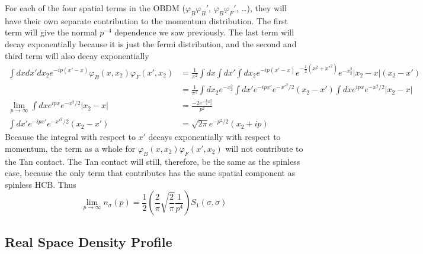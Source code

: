 \documentclass[onecolumn,english,aps,pra]{revtex4}
\begin{document}
%
For each of the four spatial terms in the OBDM ($\varphi_B\varphi_B'$, $\varphi_B\varphi_F'$, \ldots), they will have their own separate contribution to the momentum distribution. The first term will give the normal $p^{-4}$ dependence we saw previously. The last term will decay exponentially because it is just the fermi distribution, and the second and third term will also decay exponentially
\begin{align*}
\int dx dx' dx_2 e^{-ip(x'-x)}\varphi_B(x, x_2)\varphi_F(x', x_2)
& =\frac{1}{\pi^2}\int dx \int dx' \int dx_2 e^{-ip(x'-x)} e^{-\frac{1}{2}(x^2 + x'^2) } e^{-x_2^2}|x_2 - x| (x_2 - x')\\
& =\frac{1}{\pi^2}\int dx_2 e^{-x_2^2} \int dx' e^{-ipx'} e^{-x'^2/2} (x_2 - x') \int dx e^{ipx}e^{-x^2/2}|x_2 - x|\\
\lim_{p \rightarrow \infty} \int dx e^{ipx}e^{-x^2/2}|x_2 - x| &= \frac{-2 e^{-\frac{1}{2} x_2^2}}{p^2}\\
\int dx' e^{-ipx'} e^{-x'^2/2} (x_2 - x') &= \sqrt{2\pi} e^{-p^2/2} (x_2 + ip) 
\end{align*}
Because the integral with respect to $x'$ decays exponentially with respect to momentum, the term as a whole for $\varphi_B(x, x_2)\varphi_F(x', x_2)$ will not contribute to the Tan contact. The Tan contact will still, therefore, be the same as the spinless case, because the only term that contributes has the same spatial component as spinless HCB. Thus
\begin{equation}
\lim_{p \rightarrow \infty} n_{\sigma}(p) =  \frac{1}{2}\left(\frac{2}{\pi} \sqrt{\frac{2}{\pi}} \frac{1}{p^4}\right) S_{1}(\sigma, \sigma)
\label{InitTanContact}
\end{equation}

\subsection{Real Space Density Profile}
\end{document}
